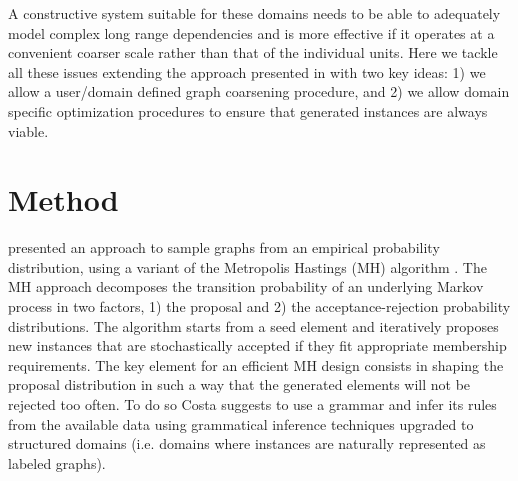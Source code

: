 \documentclass{article}
\begin{document}
A constructive system suitable for these domains needs to be able to
adequately model complex long range dependencies and is more effective if it
operates at a convenient coarser scale rather than that of the individual
units. Here we tackle all these issues extending the approach presented in
\cite{costa16} with two key ideas: 1) we allow a user/domain defined graph
coarsening procedure, and 2) we allow domain specific optimization procedures
to ensure that generated instances are always viable.


\section{Method}

\cite{costa16} presented an approach to sample graphs from an empirical
probability distribution, using a variant of the Metropolis Hastings (MH)
algorithm \citep{metropolis1953equation}. The MH approach decomposes the
transition probability of an underlying  Markov process in two factors, 1) the
proposal  and 2) the acceptance-rejection probability distributions. The
algorithm starts from a seed element and iteratively proposes new instances
that are stochastically accepted if they fit appropriate membership
requirements. The key element for an efficient MH design consists in shaping
the proposal distribution  in such a way that the generated elements will not
be rejected too often. To do so Costa suggests to use a grammar and infer its
rules from the available data using grammatical inference techniques upgraded
to structured domains (i.e. domains where instances are naturally represented
as labeled graphs).
\end{document}
